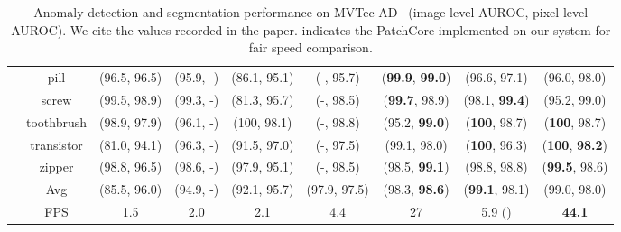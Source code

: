 \documentclass{article}
\begin{document}
\begin{table*}[]
{\begin{tabular}{cc|c|c|c|c|c|c|c}
\multicolumn{1}{c|}{}                         & pill       & (96.5, 96.5) & (95.9, -)  & (86.1, 95.1) & (-, 95.7)    & (\textbf{99.9}, \textbf{99.0})  & (96.6, 97.1) & (96.0, 98.0)   \\
\multicolumn{1}{c|}{}                         & screw      & (99.5, 98.9) & (99.3, -)  & (81.3, 95.7) & (-, 98.5)    & (\textbf{99.7}, 98.9)  & (98.1, \textbf{99.4}) & (95.2, 99.0)   \\
\multicolumn{1}{c|}{}                         & toothbrush & (98.9, 97.9) & (96.1, -)  & (100, 98.1)  & (-, 98.8)    & (95.2, \textbf{99.0})  & (\textbf{100}, 98.7)  & (\textbf{100}, 98.7)    \\
\multicolumn{1}{c|}{}                         & transistor & (81.0, 94.1) & (96.3, -)  & (91.5, 97.0) & (-, 97.5)    & (99.1, 98.0)  & (\textbf{100}, 96.3)  & (\textbf{100}, \textbf{98.2})    \\
\multicolumn{1}{c|}{}                         & zipper     & (98.8, 96.5) & (98.6, -)  & (97.9, 95.1) & (-, 98.5)    & (98.5, \textbf{99.1})  & (98.8, 98.8) & (\textbf{99.5}, 98.6)   \\ \hline
\multicolumn{1}{l|}{}                         & Avg     & (85.5, 96.0) & (94.9, -)  & (92.1, 95.7) & (97.9, 97.5) & (98.3, \textbf{98.6})  & (\textbf{99.1}, 98.1) & (99.0, 98.0)   \\ \hline
\multicolumn{1}{l|}{}                         & FPS        & 1.5         & 2.0       & 2.1         & 4.4         & 27           & 5.9 ()   & \textbf{44.1}
\end{tabular}}
\vspace{-0.3cm}
\caption{ Anomaly detection and segmentation performance on MVTec AD~\cite{mvtec} (image-level AUROC, pixel-level AUROC). We cite the values recorded in the paper.  indicates the PatchCore implemented on our system for fair speed comparison.}
\vspace{-0.5cm}
\label{tab:result}
\end{table*}
\vspace{-0.4cm}
\end{document}
